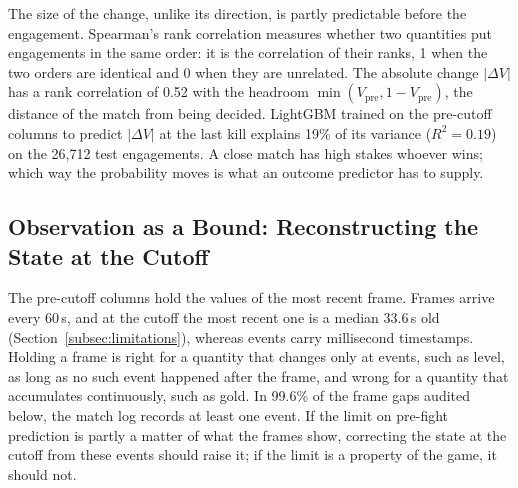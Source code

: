 The size of the change, unlike its direction, is partly predictable before the engagement. Spearman's
rank correlation measures whether two quantities put engagements in the same order: it is the correlation
of their ranks, 1 when the two orders are identical and 0 when they are unrelated. The absolute change
$|\Delta V|$ has a rank correlation of 0.52 with the headroom $\min(V_{\mathrm{pre}}, 1 - V_{\mathrm{pre}})$,
the distance of the match from being decided. LightGBM trained on the pre-cutoff columns to predict
$|\Delta V|$ at the last kill explains 19\% of its variance ($R^2 = 0.19$) on the 26,712 test engagements.
A close match has high stakes whoever wins; which way the probability moves is what an outcome predictor
has to supply.

\subsection{Observation as a Bound: Reconstructing the State at the Cutoff}\label{sec:limit-evidence}

The pre-cutoff columns hold the values of the most recent frame. Frames arrive every 60\,s, and at the
cutoff the most recent one is a median 33.6\,s old (Section~\ref{subsec:limitations}), whereas events
carry millisecond timestamps. Holding a frame is right for a quantity that changes only at events, such
as level, as long as no such event happened after the frame, and wrong for a quantity that accumulates
continuously, such as gold. In 99.6\% of the frame gaps audited below, the match log records at least one
event. If the limit on pre-fight prediction is partly a matter of what the frames show, correcting the
state at the cutoff from these events should raise it; if the limit is a property of the game, it
should not.

